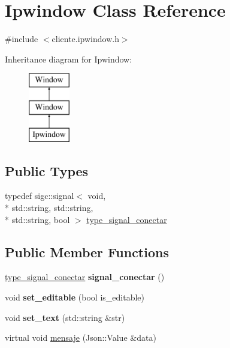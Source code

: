 \hypertarget{classIpwindow}{\section{Ipwindow Class Reference}
\label{classIpwindow}
}


{\ttfamily \#include $<$cliente.\-ipwindow.\-h$>$}

Inheritance diagram for Ipwindow\-:\begin{figure}[H]
\begin{center}
\leavevmode
\includegraphics[height=3.000000cm]{classIpwindow}
\end{center}
\end{figure}
\subsection*{Public Types}
\begin{DoxyCompactItemize}
\item 
typedef sigc\-::signal$<$ void, \\*
std\-::string, std\-::string, \\*
std\-::string, bool $>$ \hyperlink{classIpwindow_a44657903a47dd87a70847e74abeb4e68}{type\-\_\-signal\-\_\-conectar}
\end{DoxyCompactItemize}
\subsection*{Public Member Functions}
\begin{DoxyCompactItemize}
\item 
\hypertarget{classIpwindow_a783772352ac8f6dd0cf0a36d57cec35d}{\hyperlink{classIpwindow_a44657903a47dd87a70847e74abeb4e68}{type\-\_\-signal\-\_\-conectar} {\bfseries signal\-\_\-conectar} ()}\label{classIpwindow_a783772352ac8f6dd0cf0a36d57cec35d}

\item 
\hypertarget{classIpwindow_a85d72685748603d08dc6f417288f179d}{void {\bfseries set\-\_\-editable} (bool is\-\_\-editable)}\label{classIpwindow_a85d72685748603d08dc6f417288f179d}

\item 
\hypertarget{classIpwindow_a244eef48968787746981770d1cadb964}{void {\bfseries set\-\_\-text} (std\-::string \&str)}\label{classIpwindow_a244eef48968787746981770d1cadb964}

\item 
virtual void \hyperlink{classIpwindow_ac2c428b415b6a9154ee37de6c8a9dd4d}{mensaje} (Json\-::\-Value \&data)
\end{DoxyCompactItemize}
